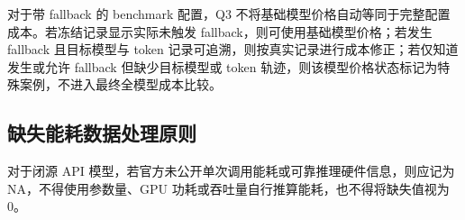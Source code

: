对于带 fallback 的 benchmark 配置，Q3 不将基础模型价格自动等同于完整配置成本。若冻结记录显示实际未触发 fallback，则可使用基础模型价格；若发生 fallback 且目标模型与 token 记录可追溯，则按真实记录进行成本修正；若仅知道发生或允许 fallback 但缺少目标模型或 token 轨迹，则该模型价格状态标记为特殊案例，不进入最终全模型成本比较。

\subsection{缺失能耗数据处理原则}

对于闭源 API 模型，若官方未公开单次调用能耗或可靠推理硬件信息，则应记为 NA，不得使用参数量、GPU 功耗或吞吐量自行推算能耗，也不得将缺失值视为 0。
